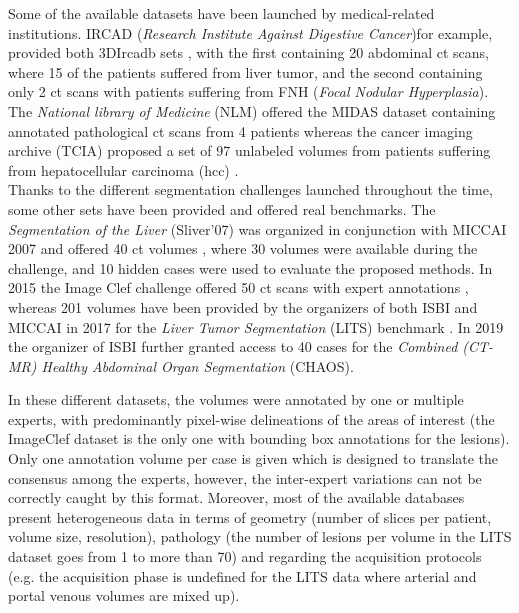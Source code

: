 Some of the available datasets have been launched by medical-related
institutions. IRCAD (\emph{Research Institute Against Digestive Cancer})for example, provided both 3DIrcadb sets \cite{3DIrcadB}, with the first containing 20 abdominal \ac{ct}
scans, where 15 of the patients suffered from liver tumor, and the
second containing only 2 \ac{ct} scans with patients suffering from FNH
(\emph{Focal Nodular Hyperplasia}).
The \emph{National library of Medicine} (NLM) offered the MIDAS dataset
containing annotated pathological \ac{ct} scans from 4 patients \cite{MIDAS} whereas the cancer imaging archive (TCIA)
proposed a set of 97 unlabeled volumes from patients suffering from
hepatocellular carcinoma (\ac{hcc}) \cite{Clark2013}. \\
Thanks to the different segmentation challenges launched throughout the
time, some other sets have been provided and offered real benchmarks.
The \emph{Segmentation of the Liver} (Sliver'07) was organized in
conjunction with MICCAI 2007 and offered 40 \ac{ct} volumes \cite{VanGinneken2007}, where 30
volumes were available during the challenge, and 10 hidden cases were
used to evaluate the proposed methods. In 2015 the Image Clef challenge
offered 50 \ac{ct} scans with expert annotations \cite{ImageClef}, whereas 201 volumes have been provided by the organizers
of both ISBI and MICCAI in 2017 for the \emph{Liver Tumor Segmentation}
(LITS) benchmark \cite{Bilic2019}. In 2019 the organizer of ISBI
further granted access to 40 cases for the \emph{Combined (CT-MR)
	Healthy Abdominal Organ Segmentation} (CHAOS)\cite{CHAOS}.

In these different datasets, the volumes were annotated by one or
multiple experts, with predominantly pixel-wise delineations of the
areas of interest (the ImageClef dataset is the only one with bounding
box annotations for the lesions). Only one annotation volume per case is
given which is designed to translate the consensus among the experts,
however, the inter-expert variations can not be correctly caught by this
format. Moreover, most of the available databases present heterogeneous
data in terms of geometry (number of slices per patient, volume size,
resolution), pathology (the number of lesions per volume in the LITS
dataset goes from 1 to more than 70) and regarding the
acquisition protocols (e.g. the acquisition phase is undefined for the
LITS data where arterial and portal venous volumes are mixed up).\\


